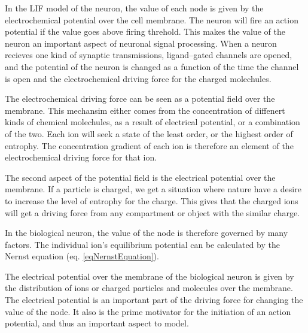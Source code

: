 \documentclass[b5paper,11 pt]{report}
\begin{document}
	In the LIF model of the neuron,  the value of each node is given by the electrochemical potential over the cell membrane. 
	The neuron will fire an action potential if the value goes above firing threhold.
	This makes the value of the neuron an important aspect of neuronal signal processing.
	When a neuron recieves one kind of synaptic transmissions, ligand--gated channels are opened, and the potential of the neuron is changed as a function of the time the channel is open 
		and the electrochemical driving force for the charged molechules.

	The electrochemical driving force can be seen as a potential field over the membrane.
	This mechansim either comes from the concentration of diffenert kinds of chemical molechules, as a result of electrical potential, or a combination of the two.
	Each ion will seek a state of the least order, or the highest order of entrophy. 
	The concentration gradient of each ion is therefore an element of the electrochemical driving force for that ion.
	
	The second aspect of the potential field is the electrical potential over the membrane. 
	If a particle is charged, we get a situation where nature have a desire to increase the level of entrophy for the charge.
	This gives that the charged ions will get a driving force from any compartment or object with the similar charge.
	
	
	In the biological neuron, the value of the node is therefore governed by many factors. 
	The individual ion's equilibrium potential can be calculated by the Nernst equation (eq. \ref{eqNernstEquation}).


	The electrical potential over the membrane of the biological neuron is given by the distribution of ions or charged particles and molecules over the  membrane.
	The electrical potential is an important part of the driving force for changing the value of the node.
	It also is the prime motivator for the initiation of an action potential, and thus an important aspect to model.
\end{document}
